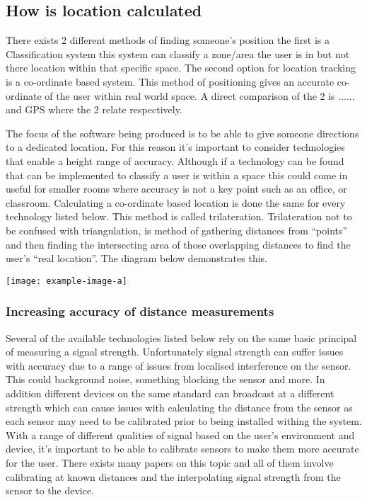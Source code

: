 \subsection{How is location calculated}
There exists 2 different methods of finding someone’s position the first is a Classification system this system can classify a zone/area the user is in but not there location within that specific space. The second option for location tracking is a co-ordinate based system. This method of positioning gives an accurate co-ordinate of the user within real world space. A direct comparison of the 2 is ...... and GPS where the 2 relate respectively.

The focus of the software being produced is to be able to give someone directions to a dedicated location. For this reason it’s important to consider technologies that enable a height range of accuracy. Although if a technology can be found that can be implemented to classify a user is within a space this could come in useful for smaller rooms where accuracy is not a key point such as an office, or classroom.
Calculating a co-ordinate based location is done the same for every technology listed below. This method is called trilateration. Trilateration not to be confused with triangulation, is method of gathering distances from “points” and then finding the intersecting area of those overlapping distances to find the user’s “real location”. The diagram below demonstrates this.
\begin{center}
	\texttt{[image: example-image-a]}
\end{center}
\subsubsection{Increasing accuracy of distance measurements}
Several of the available technologies listed below rely on the same basic principal of measuring a signal strength. Unfortunately signal strength can suffer issues with accuracy due to a range of issues from localised interference on the sensor. This could background noise, something blocking the sensor and more. In addition different devices on the same standard can broadcast at a different strength which can cause issues with calculating the distance from the sensor as each sensor may need to be calibrated prior to being installed withing the system. With a range of different qualities of signal based on the user’s environment and device, it’s important to be able to calibrate sensors to make them more accurate for the user. There exists many papers on this topic and all of them involve calibrating at known distances and the interpolating signal strength from the sensor to the device. 